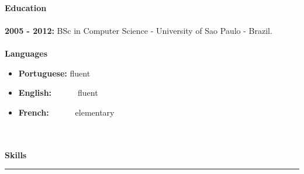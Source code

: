 \documentclass[a4paper, 10pt, onecolumn]{report}
\begin{document}
\\
{\large\textbf{Education}} \hspace{0.5em}\hrulefill
\\
\\\indent\textbf{2005 - 2012:} BSc in Computer Science - University of Sao Paulo - Brazil.
\\
\\
{\large\textbf{Languages}} \hspace{0.5em}\hrulefill
\begin{itemize}
	\item{\textbf{Portuguese:} fluent}
	\item{\textbf{English:\ \ \ \ \ } fluent}
	\item{\textbf{French:\ \ \ \ \ } elementary}
\end{itemize}
\\
\\
{\large\textbf{Skills}} \hfill \rule{5.7in}{0.5pt}\\
\end{document}
